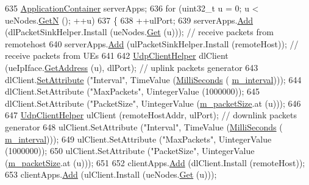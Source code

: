 \begin{DoxyCode}
635   \hyperlink{classns3_1_1ApplicationContainer}{ApplicationContainer} serverApps;
636   \textcolor{keywordflow}{for} (uint32\_t u = 0; u < ueNodes.\hyperlink{classns3_1_1NodeContainer_aed647ac56d0407a7706aba02eb44b951}{GetN} (); ++u)
637     \{
638       ++ulPort;
639       serverApps.\hyperlink{classns3_1_1ApplicationContainer_ad09ab1a1ad5849d518d5f4c262e38152}{Add} (dlPacketSinkHelper.Install (ueNodes.\hyperlink{classns3_1_1NodeContainer_a9ed96e2ecc22e0f5a3d4842eb9bf90bf}{Get} (u))); \textcolor{comment}{// receive packets from
       remotehost}
640       serverApps.\hyperlink{classns3_1_1ApplicationContainer_ad09ab1a1ad5849d518d5f4c262e38152}{Add} (ulPacketSinkHelper.Install (remoteHost));  \textcolor{comment}{// receive packets from UEs}
641 
642       \hyperlink{classns3_1_1UdpClientHelper}{UdpClientHelper} dlClient (ueIpIface.\hyperlink{classns3_1_1Ipv4InterfaceContainer_ae63208dcd222be986822937ee4aa828c}{GetAddress} (u), dlPort); \textcolor{comment}{// uplink
       packets generator}
643       dlClient.\hyperlink{classns3_1_1UdpClientHelper_a8bbae16a28f85ab3f3b5aa4642edfeae}{SetAttribute} (\textcolor{stringliteral}{"Interval"}, TimeValue (\hyperlink{group__timecivil_gaf26127cf4571146b83a92ee18679c7a9}{MilliSeconds} (
      \hyperlink{classLenaTdTbfqFfMacSchedulerTestCase2_a4c505e022817f9759194c657d194414d}{m\_interval})));
644       dlClient.SetAttribute (\textcolor{stringliteral}{"MaxPackets"}, UintegerValue (1000000));
645       dlClient.SetAttribute (\textcolor{stringliteral}{"PacketSize"}, UintegerValue (\hyperlink{classLenaTdTbfqFfMacSchedulerTestCase2_a1d0fb560aff325ef9ba8635e39ce3721}{m\_packetSize}.at (u)));
646 
647       \hyperlink{classns3_1_1UdpClientHelper}{UdpClientHelper} ulClient (remoteHostAddr, ulPort);           \textcolor{comment}{// downlink packets
       generator}
648       ulClient.SetAttribute (\textcolor{stringliteral}{"Interval"}, TimeValue (\hyperlink{group__timecivil_gaf26127cf4571146b83a92ee18679c7a9}{MilliSeconds} (
      \hyperlink{classLenaTdTbfqFfMacSchedulerTestCase2_a4c505e022817f9759194c657d194414d}{m\_interval})));
649       ulClient.SetAttribute (\textcolor{stringliteral}{"MaxPackets"}, UintegerValue (1000000));
650       ulClient.SetAttribute (\textcolor{stringliteral}{"PacketSize"}, UintegerValue (\hyperlink{classLenaTdTbfqFfMacSchedulerTestCase2_a1d0fb560aff325ef9ba8635e39ce3721}{m\_packetSize}.at (u)));
651 
652       clientApps.\hyperlink{classns3_1_1ApplicationContainer_ad09ab1a1ad5849d518d5f4c262e38152}{Add} (dlClient.Install (remoteHost));
653       clientApps.\hyperlink{classns3_1_1ApplicationContainer_ad09ab1a1ad5849d518d5f4c262e38152}{Add} (ulClient.Install (ueNodes.\hyperlink{classns3_1_1NodeContainer_a9ed96e2ecc22e0f5a3d4842eb9bf90bf}{Get} (u)));

\end{DoxyCode}
